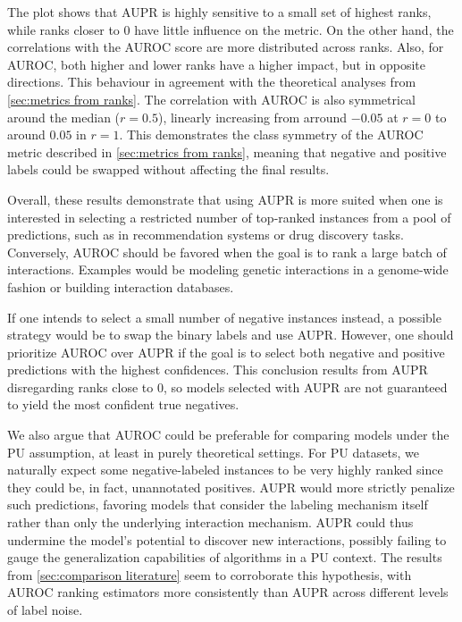 The plot shows that AUPR is highly sensitive to a small set of highest ranks, while ranks closer to $0$ have little influence on the metric. On the other hand, the correlations with the AUROC score are more distributed across ranks. Also, for AUROC, both higher and lower ranks have a higher impact, but in opposite directions.
This behaviour in agreement with the theoretical analyses from \autoref{sec:metrics from ranks}.
The correlation with AUROC is also symmetrical around the median ($r=0.5$), linearly increasing from arround $-0.05$ at $r=0$ to around $0.05$ in $r=1$. This demonstrates the class symmetry of the AUROC metric described in \autoref{sec:metrics from ranks}, meaning that negative and positive labels could be swapped without affecting the final results.

Overall, these results demonstrate that using AUPR is more suited when one is interested in selecting a restricted number of top-ranked instances from a pool of predictions, such as in recommendation systems or drug discovery tasks.
Conversely, AUROC should be favored when the goal is to rank a large batch of interactions. Examples would be modeling genetic interactions in a genome-wide fashion or building interaction databases.

If one intends to select a small number of negative instances instead, a possible strategy would be to swap the binary labels and use AUPR.
However, one should prioritize AUROC over AUPR if the goal is to select both negative and positive predictions with the highest confidences. This conclusion results from AUPR disregarding ranks close to $0$, so models selected with AUPR are not guaranteed to yield the most confident true negatives.

We also argue that AUROC could be preferable for comparing models under the PU assumption, at least in purely theoretical settings. For PU datasets, we naturally expect some negative-labeled instances to be very highly ranked since they could be, in fact, unannotated positives. AUPR would more strictly penalize such predictions, favoring models that consider the labeling mechanism itself rather than only the underlying interaction mechanism. AUPR could thus undermine the model's potential to discover new interactions, possibly failing to gauge the generalization capabilities of algorithms in a PU context. The results from \autoref{sec:comparison literature} seem to corroborate this hypothesis, with AUROC ranking estimators more consistently than AUPR across different levels of label noise.



